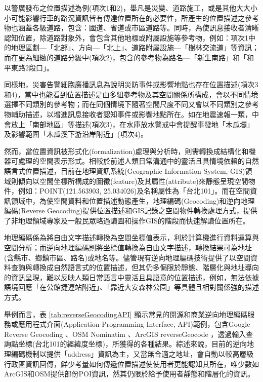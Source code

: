以警廣發布之位置描述為例(項次1和2)，舉凡是災變、道路施工，或是其他大大小小可能影響行車的路況資訊皆有傳達位置所在的必要性，所產生的位置描述之參考物也涵蓋各級道路，包含：國道、省道或市區道路等。同時，為使訊息接收者清晰認知位置，除道路對象外，會包含其他地標或附屬設施等參考物，例如：項次1中的地理區劃—「北部」、方向—「北上」、道路附屬設施—「樹林交流道」等資訊；而在更為細緻的道路分級中(項次2)，包含的參考物為路名—「新生南路」和「和平東路2段口」。

同樣地，災害告警細胞廣播訊息為說明災防事件或影響地點也存在位置描述(項次3和4)，當中也能看到位置描述是由多組參考物及其空間關係所構成，會以不同情境選擇不同類別的參考物；而在同個情境下隨著空間尺度不同又會以不同類別之參考物輔助描述，以增進訊息接收者認知事件或影響地點所在。如在地震速報一類，中會放上「南部地區」等描述(項次3)，在水庫放水警戒中會提醒事發地「木瓜壩」及影響範圍「木瓜溪下游沿岸附近」(項次4)。



然而，當位置資訊被形式化(formalization)處理與分析時，則需轉換成結構化和機器可處理的空間表示形式。相較於前述人類日常溝通中的靈活且具情境依賴的自然語言式位置描述，目前在地理資訊系統(Geographic Information System, GIS)領域則傾向以空間坐標所構成的圖徵(feature)及其屬性(attribute)來靜態呈現空間物件\parencite{RN126}，例如：POINT(121.563903, 25.034026)及名稱屬性為「台北101」。而在空間資訊領域中，為使空間資料和位置描述動態產生，地理編碼(Geocoding)和逆向地理編碼(Reverse Geocoding)提供位置描述和GIS記錄之空間物件轉換處理方式，提供了非地理領域專家及一般民眾略過讀圖和操作GIS的階段而快速解讀位置所在。

地理編碼係為將自由文字描述轉換為空間坐標值表示，利於計算機進行資料運算與空間分析；而逆向地理編碼則將坐標值轉換為自由文字描述，轉換結果可為地址(含縣市、鄉鎮市區、路名)或地名等\parencite{RN18, RN17}。儘管現有逆向地理編碼技術提供了以空間資料查詢與轉換成自然語言式的位置描述，但其仍多侷限於靜態、階層化與地址導向的資訊呈現，難以反映人類日常語言中靈活且具語意的位置描述\parencite{RN122}，例如，無法依據語境回應「在公館捷運站附近」、「靠近大安森林公園」等具體且相對關係強的描述方式。

舉例而言，表 \ref{tab:reverseGeocodingAPI} 顯示常見的開源和商業逆向地理編碼服務或應用程式介面(Application Programming Interface, API)範例，包含Google Reverse Geocoding \parencite{RN175}、OSM Nominatim \parencite{RN176}、ArcGIS reverseGeocode \parencite{RN177}，透過輸入查詢點坐標(台北101的經緯度坐標)，所獲得的各種結果。綜述來說，目前的逆向地理編碼機制以提供「address」資訊為主，又當無合適之地址，會自動以較高層級行政區資訊回傳，鮮少考量如何傳遞位置描述使使用者更能認知其所在，唯少數如ArcGIS和OSM提供部份POI資訊，然其仍限於給予使用者靜態和階層化的資訊。

